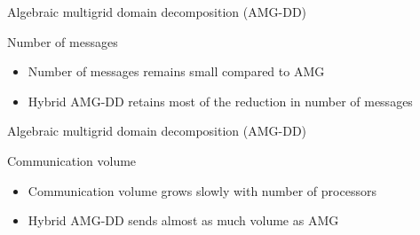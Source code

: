 \documentclass[18pt,xcolor=table]{beamer}
\begin{document}
\begin{frame}{Algebraic multigrid domain decomposition (AMG-DD)}
\begin{block}{Number of messages}
\begin{itemize}
\item Number of messages remains small compared to AMG 
\item Hybrid AMG-DD retains most of the reduction in number of messages
\end{itemize}
\end{block}

\centering
\vspace{0.5 cm}

\end{frame}

\begin{frame}{Algebraic multigrid domain decomposition (AMG-DD)}
\begin{block}{Communication volume}
\begin{itemize}
\item Communication volume grows  slowly with number of processors
\item Hybrid AMG-DD sends almost as much volume as AMG 
\end{itemize}
\end{block}

\centering
\vspace{0.5 cm}

\end{frame}
\end{document}
